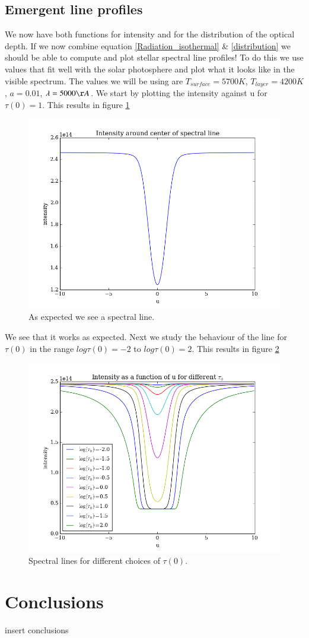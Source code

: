 \documentclass{aa}   %
\begin{document}
\subsection{Emergent line profiles}
We now have both functions for intensity and for the distribution of the optical depth. If we now combine equation \ref{Radiation_isothermal} \& \ref{distribution} we should be able to compute and plot stellar spectral line profiles!
To do this we use values that fit well with the solar photosphere and plot what it looks like in the visible spectrum.
The values we will be using are $T_{surface} = 5700 K$, $T_{layer} = 4200 K$, $a = 0.01$, $\lambda = 5000 \AA$.
We start by plotting the intensity against u for $\tau(0) = 1$. This results in figure \ref{spectral_tau1}
\begin{figure}
 \includegraphics[width=.49\textwidth]{emergent_line_orig.png}
 \caption{As expected we see a spectral line.}
 \label{spectral_tau1}
\end{figure}
We see that it works as expected.
Next we study the behaviour of the line for $\tau(0)$ in the range $log \tau(0) = -2$ to $log \tau(0) = 2$.
This results in figure \ref{spectral_logtau}
\begin{figure}
 \includegraphics[width=.49\textwidth]{emergent_line_log.png}
 \caption{Spectral lines for different choices of $\tau(0)$.}
 \label{spectral_logtau} 
\end{figure}


\section{Conclusions} \label{sec:conclusions}
insert conclusions
\begin{acknowledgements}
\end{acknowledgements}
\end{document}
